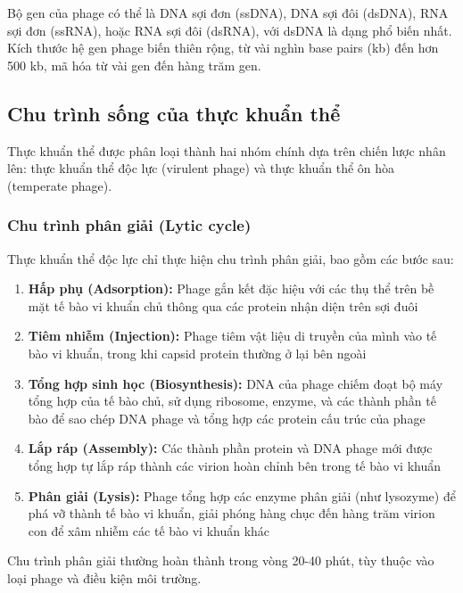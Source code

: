 Bộ gen của phage có thể là DNA sợi đơn (ssDNA), DNA sợi đôi (dsDNA), RNA sợi đơn (ssRNA), hoặc RNA sợi đôi (dsRNA), với dsDNA là dạng phổ biến nhất. Kích thước hệ gen phage biến thiên rộng, từ vài nghìn base pairs (kb) đến hơn 500 kb, mã hóa từ vài gen đến hàng trăm gen.

\subsection{Chu trình sống của thực khuẩn thể}

Thực khuẩn thể được phân loại thành hai nhóm chính dựa trên chiến lược nhân lên: thực khuẩn thể độc lực (virulent phage) và thực khuẩn thể ôn hòa (temperate phage).

\subsubsection{Chu trình phân giải (Lytic cycle)}

Thực khuẩn thể độc lực chỉ thực hiện chu trình phân giải, bao gồm các bước sau:

\begin{enumerate}
    \item \textbf{Hấp phụ (Adsorption):} Phage gắn kết đặc hiệu với các thụ thể trên bề mặt tế bào vi khuẩn chủ thông qua các protein nhận diện trên sợi đuôi

    \item \textbf{Tiêm nhiễm (Injection):} Phage tiêm vật liệu di truyền của mình vào tế bào vi khuẩn, trong khi capsid protein thường ở lại bên ngoài

    \item \textbf{Tổng hợp sinh học (Biosynthesis):} DNA của phage chiếm đoạt bộ máy tổng hợp của tế bào chủ, sử dụng ribosome, enzyme, và các thành phần tế bào để sao chép DNA phage và tổng hợp các protein cấu trúc của phage

    \item \textbf{Lắp ráp (Assembly):} Các thành phần protein và DNA phage mới được tổng hợp tự lắp ráp thành các virion hoàn chỉnh bên trong tế bào vi khuẩn

    \item \textbf{Phân giải (Lysis):} Phage tổng hợp các enzyme phân giải (như lysozyme) để phá vỡ thành tế bào vi khuẩn, giải phóng hàng chục đến hàng trăm virion con để xâm nhiễm các tế bào vi khuẩn khác
\end{enumerate}

Chu trình phân giải thường hoàn thành trong vòng 20-40 phút, tùy thuộc vào loại phage và điều kiện môi trường.

